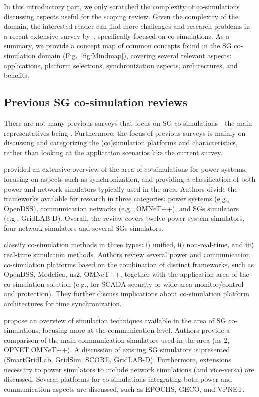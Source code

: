 \documentclass[1p]{elsarticle} %
\begin{document}
In this introductory part, we only scratched the complexity of co-simulations discussing aspects useful for the scoping review. Given the complexity of the domain, the interested reader can find more challenges and research problems in a recent extensive survey by~\citet{ref:gomes2018co-sim-survey-acm}, specifically focused on co-simulations. As a summary, we provide a concept map of common concepts found in the SG co-simulation domain (Fig.~\ref{fig:Mindmap}), covering several relevant aspects: applications, platform selections, synchronization aspects, architectures, and benefits.

\subsection{Previous SG co-simulation reviews}
There are not many previous surveys that focus on SG co-simulations---the main representatives being \cite{ref:vogt2018survey, ref:li2014cosim-platforms-review,ref:mets2014combining,ref:yi2016overview,ref:schloegl2015towards}. Furthermore, the focus of previous surveys is mainly on discussing and categorizing the (co)simulation platforms and characteristics, rather than looking at the application scenarios like the current survey.

\citet{ref:mets2014combining} provided an extensive overview of the area of co-simulations for power systems, focusing on aspects such as synchronization, and providing a classification of both power and network simulators typically used in the area. Authors divide the frameworks available for research in three categories: power systems (e.g., OpenDSS), communication networks (e.g., OMNeT++), and SGs simulators (e.g., GridLAB-D). Overall, the review covers twelve power system simulators, four network simulators and several SGs simulators.  


\citet{ref:yi2016overview} classify co-simulation methods in three types: i) unified, ii) non-real-time, and iii) real-time simulation methods. Authors review several power and communication co-simulation platforms based on the combination of distinct frameworks, such as OpenDSS, Modelica, ns2, OMNeT++, together with the application area of the co-simulation solution (e.g., for SCADA security or wide-area monitor/control and protection). They further discuss  implications about co-simulation platform architectures for time synchronization.

\citet{ref:li2014simulation-review} propose an overview of simulation techniques available in the area of SG co-simulations, focusing more at the communication level. Authors provide a comparison of the main communication simulators used in the area (ns-2, OPNET,OMNeT++). A discussion of existing SG simulators is presented (SmartGridLab, GridSim, SCORE, GridLAB-D). Furthermore, extensions necessary to power simulators to include network simulations (and vice-versa) are discussed. Several platforms for co-simulations integrating both power and communication aspects are discussed, such as EPOCHS, GECO, and VPNET.
\end{document}
